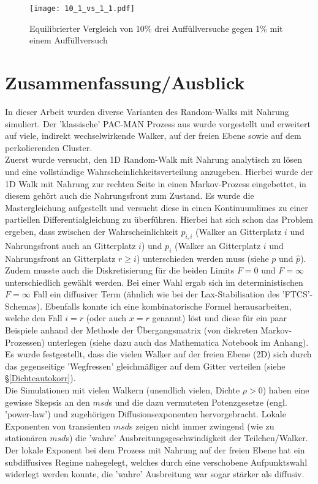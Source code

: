 \documentclass[a4paper, 12pt]{report}
\begin{document}
\begin{figure}[H]
	\centering
	\texttt{[image: 10\_1\_vs\_1\_1.pdf]}
	\caption{Equilibrierter Vergleich von 10\% drei Auffüllversuche gegen 1\% mit einem Auffüllversuch}
\end{figure}

\clearpage
\chapter{Zusammenfassung/Ausblick}
In dieser Arbeit wurden diverse Varianten des Random-Walks mit Nahrung simuliert. Der 'klassische' PAC-MAN Prozess aus \cite{doi:10.1063/1.4999485} wurde vorgestellt und erweitert auf viele, indirekt wechselwirkende Walker, auf der freien Ebene sowie auf dem perkolierenden Cluster.
\\
Zuerst wurde versucht, den 1D Random-Walk mit Nahrung analytisch zu lösen und eine vollständige Wahrscheinlichkeitsverteilung anzugeben. Hierbei wurde der 1D Walk mit Nahrung zur rechten Seite in einen Markov-Prozess eingebettet, in diesem gehört auch die Nahrungsfront zum Zustand. Es wurde die Mastergleichung aufgestellt und versucht diese in einen Kontinuumlimes zu einer partiellen Differentialgleichung zu überführen. Hierbei hat sich schon das Problem ergeben, dass zwischen der Wahrscheinlichkeit $p_{i,i}$ (Walker an Gitterplatz $i$ und Nahrungsfront auch an Gitterplatz $i$) und $p_i$ (Walker an Gitterplatz $i$ und Nahrungsfront an Gitterplatz $r \geq i$) unterschieden werden muss (siehe $p$ und $\hat{p}$). Zudem musste auch die Diskretisierung für die beiden Limits $F=0$ und $F=\infty$ unterschiedlich gewählt werden. Bei einer Wahl ergab sich im deterministischen $F=\infty$ Fall ein diffusiver Term (ähnlich wie bei der Lax-Stabilisation des 'FTCS'-Schemas). Ebenfalls konnte ich eine kombinatorische Formel herausarbeiten, welche den Fall $i=r$ (oder auch $x=r$ genannt) löst und diese für ein paar Beispiele anhand der Methode der Übergangsmatrix (von diskreten Markov-Prozessen) unterlegen (siehe dazu auch das Mathematica Notebook im Anhang).
\\
Es wurde festgestellt, dass die vielen Walker auf der freien Ebene (2D) sich durch das gegenseitige 'Wegfressen' gleichmäßiger auf dem Gitter verteilen (siehe §\ref{Dichteautokorr}).
\\
Die Simulationen mit vielen Walkern (unendlich vielen, Dichte $\rho > 0$) haben eine gewisse Skepsis an den $msd$s und die dazu vermuteten Potenzgesetze (engl. 'power-law') und zugehörigen Diffusionsexponenten hervorgebracht. Lokale Exponenten von transienten $msd$s zeigen nicht immer zwingend (wie zu stationären $msd$s) die 'wahre' Ausbreitungsgeschwindigkeit der Teilchen/Walker. Der lokale Exponent bei dem Prozess mit Nahrung auf der freien Ebene hat ein subdiffusives Regime nahegelegt, welches durch eine verschobene Aufpunktswahl widerlegt werden konnte, die 'wahre' Ausbreitung war sogar stärker als diffusiv.
\end{document}
